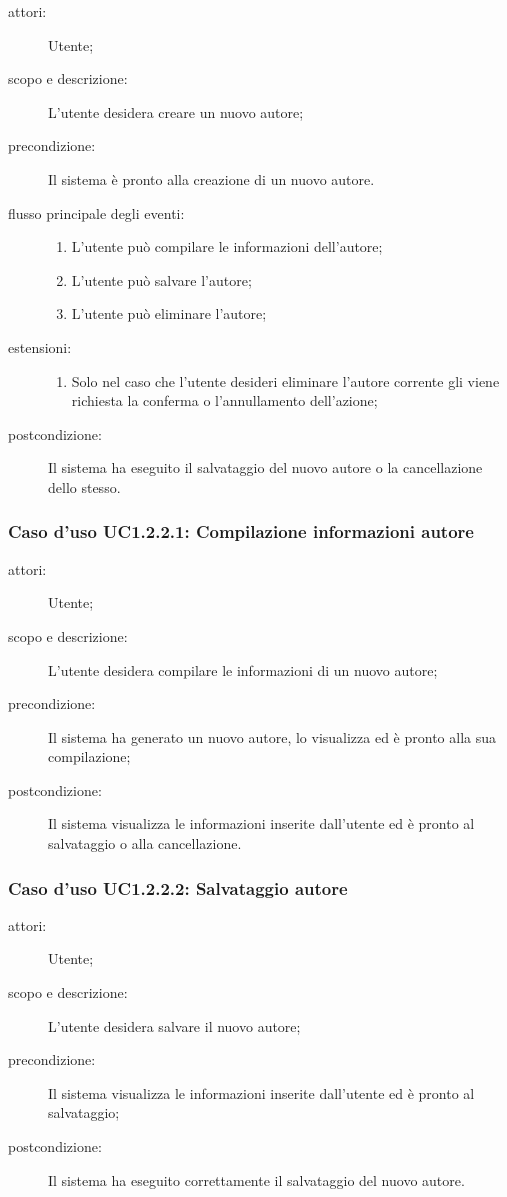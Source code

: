 \begin{description}
\item[attori:] Utente;
\item[scopo e descrizione:] L'utente desidera creare un nuovo autore;
\item[precondizione:] Il sistema è pronto alla creazione di un nuovo autore.
\item[flusso principale degli eventi:] \hfill 
	\begin{enumerate}
	\item L'utente può compilare le informazioni dell'autore;
	\item L'utente può salvare l'autore;
	\item L'utente può eliminare l'autore;
	\end{enumerate}
\item[estensioni:] \hfill
	\begin{enumerate}
	\item Solo nel caso che l'utente desideri eliminare l'autore corrente gli viene richiesta la conferma o l'annullamento dell'azione;
	\end{enumerate}
\item[postcondizione:] Il sistema ha eseguito il salvataggio del nuovo autore o la cancellazione dello stesso.
\end{description}

\subsubsection{Caso d'uso UC1.2.2.1: Compilazione informazioni autore}
\begin{description}
\item[attori:] Utente;
\item[scopo e descrizione:] L'utente desidera compilare le informazioni di un nuovo autore;
\item[precondizione:] Il sistema ha generato un nuovo autore, lo visualizza ed è pronto alla sua compilazione;
\item[postcondizione:] Il sistema visualizza le informazioni inserite dall'utente ed è pronto al salvataggio o alla cancellazione.
\end{description}

\subsubsection{Caso d'uso UC1.2.2.2: Salvataggio autore}
\begin{description}
\item[attori:] Utente;
\item[scopo e descrizione:] L'utente desidera salvare il nuovo autore;
\item[precondizione:] Il sistema visualizza le informazioni inserite dall'utente ed è pronto al salvataggio;
\item[postcondizione:] Il sistema ha eseguito correttamente il salvataggio del nuovo autore.
\end{description}

